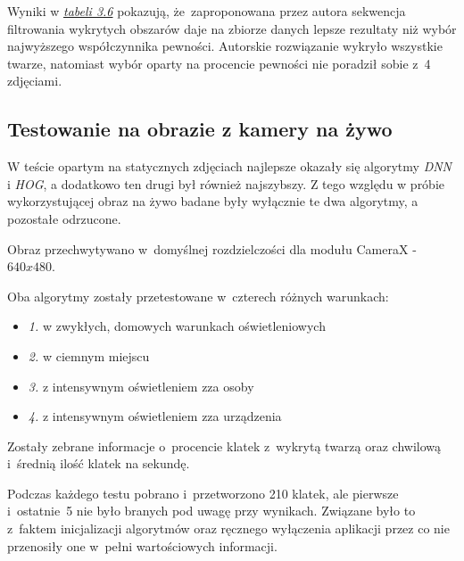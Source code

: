 \par

\vspace{8mm}



Wyniki w \hyperref[{tab:face_filter_test}]{\textit{tabeli 3.6}} pokazują, że~zaproponowana przez autora sekwencja filtrowania wykrytych obszarów daje na zbiorze danych lepsze rezultaty niż wybór najwyższego współczynnika pewności. Autorskie rozwiązanie wykryło wszystkie twarze, natomiast wybór oparty na procencie pewności nie poradził sobie z~4 zdjęciami.


\subsection{Testowanie na obrazie z kamery na żywo} \label{section:face_detection_test_live}

W teście opartym na statycznych zdjęciach najlepsze okazały się algorytmy \textit{DNN} i \textit{HOG}, a dodatkowo ten drugi był również najszybszy. Z tego względu w próbie wykorzystującej obraz na żywo badane były wyłącznie te dwa algorytmy, a pozostałe odrzucone.

\par

Obraz przechwytywano w~domyślnej rozdzielczości dla modułu CameraX - $640x480$.

\par

Oba algorytmy zostały przetestowane w~czterech różnych warunkach:

\begin{itemize}
    \item \textit{1.} w zwykłych, domowych warunkach oświetleniowych
    \item \textit{2.} w ciemnym miejscu
    \item \textit{3.} z intensywnym oświetleniem zza osoby 
    \item \textit{4.} z intensywnym oświetleniem zza urządzenia
\end{itemize}

Zostały zebrane informacje o~procencie klatek z~wykrytą twarzą oraz chwilową i~średnią ilość klatek na sekundę. 

\par

Podczas każdego testu pobrano i~przetworzono 210 klatek, ale pierwsze i~ostatnie~5 nie było branych pod uwagę przy wynikach. Związane było to z~faktem inicjalizacji algorytmów oraz ręcznego wyłączenia aplikacji przez co nie przenosiły one w~pełni wartościowych informacji.




